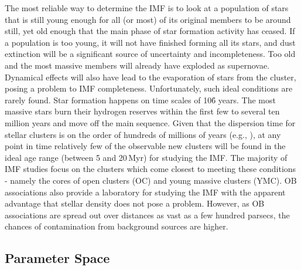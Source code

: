 The most reliable way to determine the IMF is to look at a population of stars that is still young enough for all (or most) of its original members to be around still, yet old enough that the main phase of star formation activity has ceased. 
If a population is too young, it will not have finished forming all its stars, and dust extinction will be a significant source of uncertainty and incompleteness. Too old and the most massive members will already have exploded as supernovae. 
Dynamical effects will also have lead to the evaporation of stars from the cluster, posing a problem to IMF completeness.
Unfortunately, such ideal conditions are rarely found. 
Star formation happens on time scales of 10\h6 years. 
The most massive stars burn their hydrogen reserves within the first few to several ten million years and move off the main sequence. 
Given that the dispersion time for stellar clusters is on the order of hundreds of millions of years (e.g., \citealt{Lada2003-ip}), at any point in time relatively few of the observable new clusters will be found in the ideal age range (between 5 and 20\,Myr) for studying the IMF. 
The majority of IMF studies focus on the clusters which come closest to meeting these conditions - namely the cores of open clusters (OC) and young massive clusters (YMC). 
OB associations also provide a laboratory for studying the IMF with the apparent advantage that stellar density does not pose a problem. However, as OB associations are spread out over distances as vast as a few hundred parsecs, the chances of contamination from background sources are higher. 


\subsection{Parameter Space}

